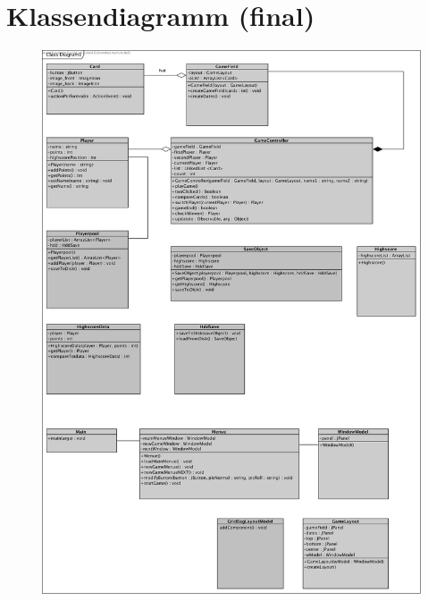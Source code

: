 \clearpage

\chapter{Klassendiagramm (final)}

\begin{figure}[!h]
	\centering
    \includegraphics[width=\textwidth]{./Klassendiagramm.png}
	\label{layout_gesamt}
\end{figure}







